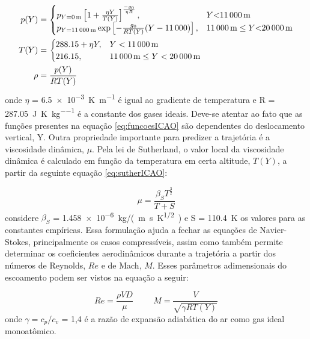 \begin{equation}
\label{eq:funcoesICAO}
\begin{aligned}
p(Y) &=\begin{cases}
			p_{Y=\qty{0}{\metre}}\left[1 + \frac{\eta Y}{T(Y)} \right]^{\frac{-g_{0}}{\eta R}} , & Y \qty{< 11000}{\metre}\\
            p_{Y=\qty{11000}{\metre}} \exp\left[-\frac{g_{0}}{RT(Y)}(Y-\num{11000}) \right], & \qty{11000}{\metre} \leq Y \qty{< 20000}{\metre}
		 \end{cases}
\\
T(Y) &=\begin{cases}
			\num{288,15} + \eta Y, & Y < \qty{11000}{\metre}\\
            \num{216,15}, & \qty{11000}{\metre} \leq Y < \qty{20000}{\metre}
		 \end{cases}
\\
\rho &= \frac{p(Y)}{RT(Y)}
\end{aligned}
\end{equation}
%
onde \(\eta\) = \qty{6,5e-3}{\kelvin\per\metre} é igual ao gradiente de temperatura e R = \qty{287,05}{\joule\per\kelvin\per\kilogram} é a constante dos gases ideais. Deve-se atentar ao fato que as funções presentes na equação \ref{eq:funcoesICAO} são dependentes do deslocamento vertical, Y. Outra propriedade importante para predizer a trajetória é a viscosidade dinâmica, \(\mu\). Pela lei de Sutherland, o valor local da viscosidade dinâmica é calculado em função da temperatura em certa altitude, \(T(Y)\), a partir da seguinte equação \ref{eq:sutherICAO}:

\begin{equation}
\label{eq:sutherICAO}
\mu = \frac{\beta_{S}T^{\frac{3}{2}}}{T + S}
\end{equation}
%
considere \(\beta_{S}\) = \qty{1,458e-6}{kg/(m.s.K^{1/2})} e S = \qty{110,4}{\kelvin} os valores para as constantes empíricas. Essa formulação ajuda a fechar as equações de Navier-Stokes, principalmente os casos compressíveis, assim como também permite determinar os coeficientes aerodinâmicos durante a trajetória a partir dos números de Reynolds, \(Re\) e de Mach, \(M\). Esses parâmetros adimensionais do escoamento podem ser vistos na equação a seguir:

\begin{equation}
    Re = \frac{\rho V D}{\mu} \hspace{1cm}
    M = \frac{V}{\sqrt{\gamma RT(Y)}}
\end{equation}
%
onde \(\gamma = c_{p}/c_{v}\) = 1,4 é a razão de expansão adiabática do ar como gas ideal monoatômico.
